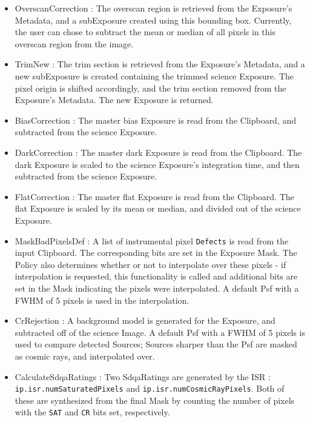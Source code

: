 \begin{itemize}
\item OverscanCorrection : The overscan region is retrieved from the
Exposure's Metadata, and a subExposure created using this bounding
box.  Currently, the user can chose to subtract the mean or median of
all pixels in this overscan region from the image.  

\item TrimNew : The trim section is retrieved from the Exposure's
Metadata, and a new subExposure is created containing the trimmed
science Exposure.  The pixel origin is shifted accordingly, and the
trim section removed from the Exposure's Metadata.  The new Exposure
is returned.

\item BiasCorrection : The master bias Exposure is read from the
Clipboard, and subtracted from the science Exposure.

\item DarkCorrection : The master dark Exposure is read from the
Clipboard.  The dark Exposure is scaled to the science Exposure's
integration time, and then subtracted from the science Exposure.

\item FlatCorrection : The master flat Exposure is read from the
Clipboard.  The flat Exposure is scaled by its mean or median, and
divided out of the science Exposure.

\iffalse
\item IlluminationCorrection : This is the same functionality as {\tt
FlatCorrection}.   \RHL{...but may need a different flat, depending on
how we handle the photometric v. cosmetic flats.}
\fi

\item MaskBadPixelsDef : A list of instrumental pixel \texttt{Defects} is read 
from the input Clipboard.  The corresponding bits are set in the
Exposure Mask.  The Policy also determines whether or not to
interpolate over these pixels - if interpolation is requested, this
functionality is called and additional bits are set in the Mask
indicating the pixels were interpolated.  A default Psf with a FWHM of
5 pixels is used in the interpolation.

\item CrRejection : A background model is generated for the Exposure, 
and subtracted off of the science Image.  A default Psf with a FWHM of
5 pixels is used to compare detected Sources; Sources sharper than the
Psf are masked as cosmic rays, and interpolated over.

\item CalculateSdqaRatings : Two SdqaRatings are generated by the ISR : 
{\tt ip.isr.numSaturatedPixels} and {\tt ip.isr.numCosmicRayPixels}.
Both of these are synthesized from the final Mask by counting the
number of pixels with the {\tt SAT} and {\tt CR} bits set,
respectively.

\end{itemize}


